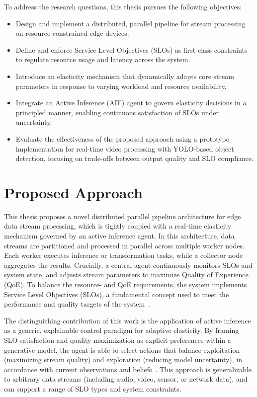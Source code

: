 To address the research questions, this thesis pursues the following objectives:

\begin{itemize}
    \item Design and implement a distributed, parallel pipeline for stream processing on resource-constrained edge devices.
    
    \item Define and enforce Service Level Objectives (SLOs) as first-class constraints to regulate resource usage and latency across the system.
    
    \item Introduce an elasticity mechanism that dynamically adapts core stream parameters in response to varying workload and resource availability.
    
    \item Integrate an Active Inference (AIF) agent to govern elasticity decisions in a principled manner, enabling continuous satisfaction of SLOs under uncertainty.
    
    \item Evaluate the effectiveness of the proposed approach using a prototype implementation for real-time video processing with YOLO-based object detection, focusing on trade-offs between output quality and SLO compliance.
\end{itemize}


\section{Proposed Approach}
This thesis proposes a novel distributed parallel pipeline architecture for edge data stream processing, which is tightly coupled with a real-time elasticity mechanism governed by an active inference agent. In this architecture, data streams are partitioned and processed in parallel across multiple worker nodes. Each worker executes inference or transformation tasks, while a collector node aggregates the results. Crucially, a central agent continuously monitors SLOs and system state, and adjusts stream parameters to maximize Quality of Experience (QoE). To balance the resource- and QoE requirements, the system implements Service Level Objectives (SLOs), a fundamental concept used to meet the performance and quality targets of the system~\cite{sedlak_towards_2025, nastic_sloc_2020}.

The distinguishing contribution of this work is the application of active inference as a generic,
explainable control paradigm for adaptive elasticity. By framing SLO satisfaction and quality maximization as explicit preferences within a generative model, the agent is able to select actions that balance exploitation (maximizing stream quality) and exploration (reducing model uncertainty), in accordance with current observations and beliefs~\cite{casamayor_pujol_deepslos_2024, sedlak_adaptive_2024, danilenka_adaptive_2025, lanillos_active_2021}. This approach is generalizable to arbitrary data streams (including audio, video, sensor, or network data), and can support a range of SLO types and system constraints.

